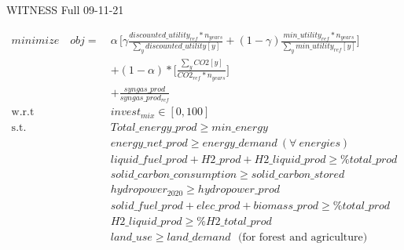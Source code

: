 \documentclass{article}
\begin{document}
WITNESS Full 09-11-21

\begin{equation}
\begin{aligned}
minimize \quad  obj =~
& \alpha\,\Bigg[\gamma \frac{discounted\_utility_{ref}*n_{years}}{\sum_{y}discounted\_utility[y]}
+ (1 - \gamma) \frac{min\_utility_{ref}*n_{years}}{\sum_{y}min\_utility_{ref}[y]} \Bigg] \\
& +(1-\alpha)*\Bigg[\frac{\sum_{y}CO2[y]}{CO2_{ref}*n_{years}} \Bigg] \\
%
%
&  + \frac{syngas\_prod}{syngas\_prod_{ref}}
\\
\textrm{w.r.t} \quad & invest_{mix} \in [0,100]\\
\textrm{s.t.} \quad
  & Total\_energy\_prod \geq min\_energy \\
  & energy\_net\_prod \geq energy\_demand ~(\forall~ energies) \\
  & liquid\_fuel\_prod + H2\_prod + H2\_liquid\_prod \geq \%total\_prod \\
  & solid\_carbon\_consumption \geq solid\_carbon\_stored \\
  & hydropower_{2020} \geq hydropower\_prod \\
  & solid\_fuel\_prod + elec\_prod + biomass\_prod \geq \%total\_prod \\
  & H2\_liquid\_prod \geq \% H2\_total\_prod \\
  & land\_use \geq land\_demand \textrm{~~(for forest and agriculture)}
\end{aligned}
\end{equation}
\end{document}
